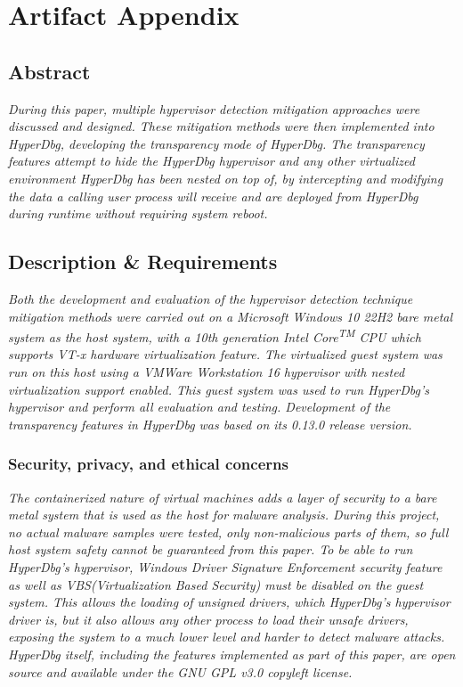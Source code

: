 
\section{Artifact Appendix}

\subsection{Abstract}
{\em During this paper, multiple hypervisor detection mitigation approaches were discussed and designed. These mitigation methods were then implemented into HyperDbg, 
developing the transparency mode of HyperDbg. The transparency features attempt to hide the HyperDbg hypervisor and any other virtualized environment HyperDbg has been nested on top of, 
by intercepting and modifying the data a calling user process will receive and are deployed from HyperDbg during runtime without requiring system reboot.}

\subsection{Description \& Requirements}

\textit{Both the development and evaluation of the hypervisor detection technique mitigation methods were carried out
on a Microsoft Windows 10 22H2 bare metal system as the host system, with a 10th generation Intel Core\textsuperscript{TM} CPU which supports VT-x hardware virtualization feature.
The virtualized guest system was run on this host using a VMWare Workstation 16 hypervisor with nested virtualization support enabled.
This guest system was used to run HyperDbg's hypervisor and perform all evaluation and testing. Development of the transparency features in HyperDbg was based on its 0.13.0 release version. }

\subsubsection{Security, privacy, and ethical concerns}
\textit{The containerized nature of virtual machines adds a layer of security to a bare metal system that is used as the host for malware analysis.
During this project, no actual malware samples were tested, only non-malicious parts of them, so full host system safety cannot be guaranteed from this paper.
To be able to run HyperDbg's hypervisor, Windows Driver Signature Enforcement security feature as well as VBS(Virtualization Based Security) must be disabled on the guest system.
This allows the loading of unsigned drivers, which HyperDbg's hypervisor driver is, but it also allows any other process to load their unsafe drivers, 
exposing the system to a much lower level and harder to detect malware attacks. HyperDbg itself, including the features implemented as part of this paper, are open source and available under the GNU GPL v3.0 copyleft license.}

